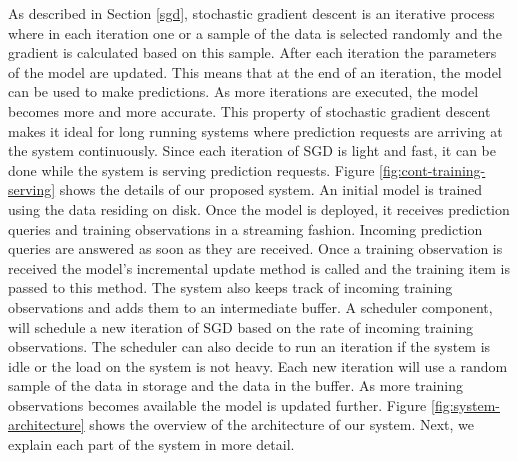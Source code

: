 \documentclass{sig-alternate-05-2015}
\begin{document}
As described in Section \ref{sgd}, stochastic gradient descent is an iterative process where in each iteration one or a sample of the data is selected randomly and the gradient is calculated based on this sample. 
After each iteration the parameters of the model are updated.
This means that at the end of an iteration, the model can be used to make predictions.
As more iterations are executed, the model becomes more and more accurate.
This property of stochastic gradient descent makes it ideal for long running systems where prediction requests are arriving at the system continuously.
Since each iteration of SGD is light and fast, it can be done while the system is serving prediction requests.
Figure \ref{fig:cont-training-serving} shows the details of our proposed system.
An initial model is trained using the data residing on disk.
Once the model is deployed, it receives prediction queries and training observations in a streaming fashion.
Incoming prediction queries are answered as soon as they are received.
Once a training observation is received the model's incremental update method is called and the training item is passed to this method.
The system also keeps track of incoming training observations and adds them to an intermediate buffer.
A scheduler component, will schedule a new iteration of SGD based on the rate of incoming training observations. 
The scheduler can also decide to run an iteration if the system is idle or the load on the system is not heavy. 
Each new iteration will use a random sample of the data in storage and the data in the buffer. 
As more training observations becomes available the model is updated further.
Figure \ref{fig:system-architecture} shows the overview of the architecture of our system.
Next, we explain each part of the system in more detail.
\end{document}
